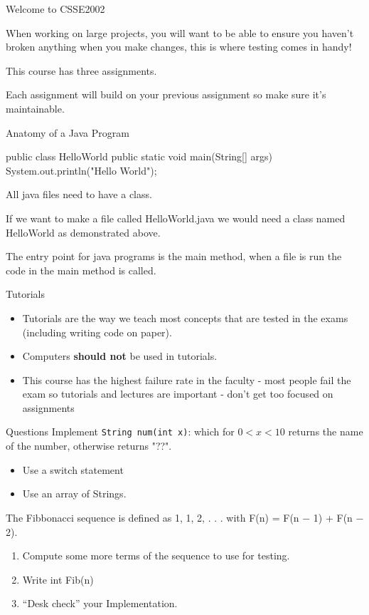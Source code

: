 \documentclass[week2]{csse2002}
\begin{document}
\begin{topic}{Welcome to CSSE2002}
\begin{subtopic}{6}
When working on large projects, you will want to be able to ensure you haven't broken anything when you make changes, this is where testing comes in handy!
\end{subtopic}

\begin{subtopic}{7}
This course has three assignments.

Each assignment will build on your previous assignment so make sure it's maintainable.
\end{subtopic}

\end{topic}

\begin{topic}{Anatomy of a Java Program}
\begin{java}
public class HelloWorld {
    public static void main(String[] args) {
        System.out.println("Hello World");
    }
}
\end{java}

All java files need to have a class.

If we want to make a file called HelloWorld.java we would need a class named HelloWorld as demonstrated above.

The entry point for java programs is the main method, when a file is run the code in the main method is called.
\end{topic}

\begin{topic}{Tutorials}
\begin{itemize}
\item Tutorials are the way we teach most concepts that are tested in the exams (including writing code on paper).

\item Computers \textbf{should not} be used in tutorials.

\item This course has the highest failure rate in the faculty - most people fail the exam so tutorials and lectures are important - don't get too focused on assignments
\end{itemize}
\end{topic}

\begin{topic}{Questions}
Implement \texttt{String num(int x)}: which for $0 < x < 10$ returns the name of the number, otherwise returns "??".
\begin{itemize}
	\item Use a switch statement
	\item Use an array of Strings.
\end{itemize}

The Fibbonacci sequence is defined as 1, 1, 2, . . . with F(n) = F(n − 1) + F(n − 2).
\begin{enumerate}
	\item Compute some more terms of the sequence to use for testing.
	\item Write int Fib(n)
	\item “Desk check” your Implementation.
\end{enumerate}
\end{topic}
\end{document}
